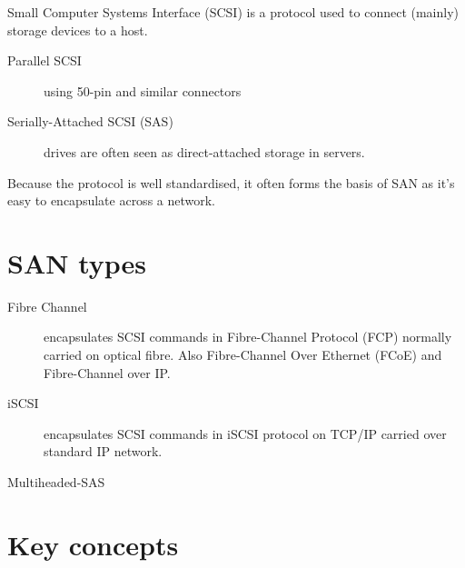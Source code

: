 \documentclass[slides]{pgnotes}
\begin{document}
Small Computer Systems Interface (SCSI) is a protocol used to connect
(mainly) storage devices to a host.

\begin{description}
\item[Parallel SCSI]
using 50-pin and similar connectors
\item[Serially-Attached SCSI (SAS)]
drives are often seen as direct-attached storage in servers.
\end{description}

Because the protocol is well standardised, it often forms the basis of
SAN as it's easy to encapsulate across a network.


\section{SAN types}
\label{sec:san-types}

\begin{description}
\item[Fibre Channel]
encapsulates SCSI commands in Fibre-Channel Protocol (FCP) normally
carried on optical fibre. Also Fibre-Channel Over Ethernet (FCoE) and
Fibre-Channel over IP.
\item[iSCSI]
encapsulates SCSI commands in iSCSI protocol on TCP/IP carried over
standard IP network.
\item[Multiheaded-SAS]
\end{description}

\section{Key concepts}
\label{sec:key-concepts}
\end{document}
